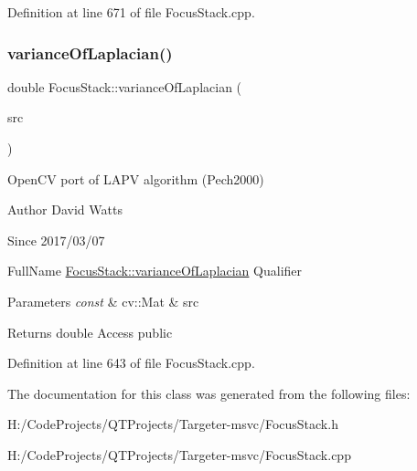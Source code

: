 Definition at line 671 of file Focus\+Stack.\+cpp.

\mbox{\label{class_focus_stack_afc9e634d57f2b2f0df1d6d615cd44c15}} 
\subsubsection{\texorpdfstring{variance\+Of\+Laplacian()}{varianceOfLaplacian()}}
{\footnotesize\ttfamily double Focus\+Stack\+::variance\+Of\+Laplacian (\begin{DoxyParamCaption}\item[{const cv\+::\+Mat \&}]{src }\end{DoxyParamCaption})\hspace{0.3cm}{\ttfamily [static]}}

Open\+CV port of \textquotesingle{}L\+A\+PV\textquotesingle{} algorithm (Pech2000)

\begin{DoxyAuthor}{Author}
David Watts 
\end{DoxyAuthor}
\begin{DoxySince}{Since}
2017/03/07
\end{DoxySince}
Full\+Name \hyperlink{class_focus_stack_afc9e634d57f2b2f0df1d6d615cd44c15}{Focus\+Stack\+::variance\+Of\+Laplacian} Qualifier 
\begin{DoxyParams}{Parameters}
{\em const} & cv\+::\+Mat \& src \\
\hline
\end{DoxyParams}
\begin{DoxyReturn}{Returns}
double Access public 
\end{DoxyReturn}


Definition at line 643 of file Focus\+Stack.\+cpp.



The documentation for this class was generated from the following files\+:\begin{DoxyCompactItemize}
\item 
H\+:/\+Code\+Projects/\+Q\+T\+Projects/\+Targeter-\/msvc/Focus\+Stack.\+h\item 
H\+:/\+Code\+Projects/\+Q\+T\+Projects/\+Targeter-\/msvc/Focus\+Stack.\+cpp\end{DoxyCompactItemize}
